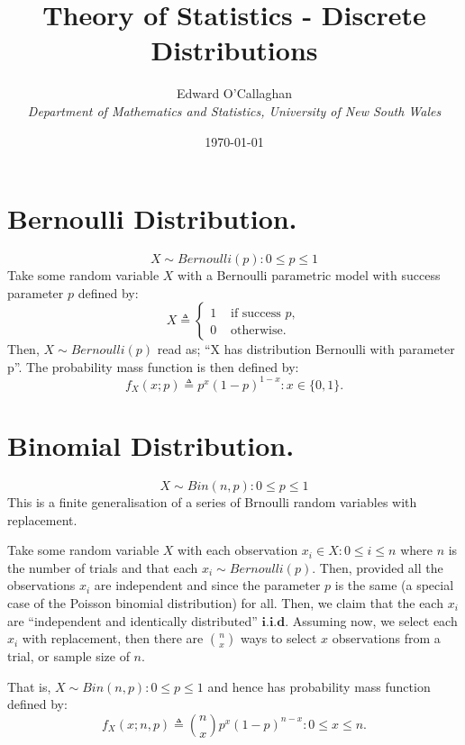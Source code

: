 \documentclass[10pt,a4paper]{article}
\title{\textbf{Theory of Statistics - Discrete Distributions}\\}
\author{Edward O'Callaghan\\
\textit{Department of Mathematics and Statistics, University of New South Wales}}
\date{\today}
\begin{document}
\maketitle

\section{Bernoulli Distribution.}
\begin{equation}\label{eqn:bernoullidist}
 \boxed{X \sim Bernoulli (p) : 0 \leq p \leq 1}
\end{equation}
Take some random variable $X$ with a Bernoulli parametric model with success parameter $p$ defined by:
\begin{displaymath}
   X \triangleq \left\{
     \begin{array}{lr}
       1 & \mbox{ if success } p, \\
       0 & \mbox{ otherwise.}
     \end{array}
   \right.
\end{displaymath} 
Then, $X \sim Bernoulli (p)$ read as; ``X has distribution Bernoulli with parameter p''.
The probability mass function is then defined by:
\begin{equation}\label{eqn:bernoulli}
 \boxed{f_{X}(x; p) \triangleq p^{x}(1 - p)^{1 - x} : x \in \{0, 1\}.}
\end{equation}

\section{Binomial Distribution.}
\begin{equation}\label{eqn:bindist}
 \boxed{X \sim Bin(n, p) : 0 \leq p \leq 1}
\end{equation}
This is a finite generalisation of a series of Brnoulli random variables with replacement.

Take some random variable $X$ with each observation $x_{i} \in X : 0 \leq i \leq n$ where $n$ is the number of trials and that each $x_{i} \sim Bernoulli (p)$.
Then, provided all the observations $x_{i}$ are independent and since the parameter $p$ is the same (a special case of the Poisson binomial distribution) for all.
Then, we claim that the each $x_{i}$ are ``independent and identically distributed'' $\textbf{i.i.d}$.
Assuming now, we select each $x_{i}$ with replacement, then there are $n \choose x$ ways to select $x$ observations from a trial, or sample size of $n$.

That is, $X \sim Bin(n, p) : 0 \leq p \leq 1$ and hence has probability mass function defined by:
\begin{equation}\label{eqn:binomial}
 \boxed{f_{X}(x; n, p) \triangleq {n \choose x} p^{x} (1 - p)^{n - x} : 0 \leq x \leq n.}
\end{equation}
\end{document}
